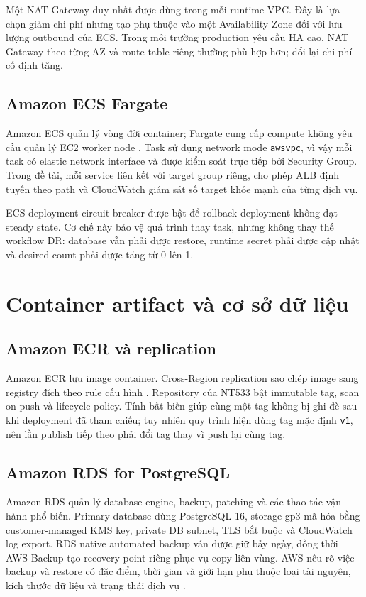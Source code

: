 Một NAT Gateway duy nhất được dùng trong mỗi runtime VPC. Đây là lựa chọn giảm chi phí nhưng tạo phụ thuộc vào một Availability Zone đối với lưu lượng outbound của ECS. Trong môi trường production yêu cầu HA cao, NAT Gateway theo từng AZ và route table riêng thường phù hợp hơn; đổi lại chi phí cố định tăng.

\subsection{Amazon ECS Fargate}

Amazon ECS quản lý vòng đời container; Fargate cung cấp compute không yêu cầu quản lý EC2 worker node \cite{aws-ecs-fargate}. Task sử dụng network mode \texttt{awsvpc}, vì vậy mỗi task có elastic network interface và được kiểm soát trực tiếp bởi Security Group. Trong đề tài, mỗi service liên kết với target group riêng, cho phép ALB định tuyến theo path và CloudWatch giám sát số target khỏe mạnh của từng dịch vụ.

ECS deployment circuit breaker được bật để rollback deployment không đạt steady state. Cơ chế này bảo vệ quá trình thay task, nhưng không thay thế workflow DR: database vẫn phải được restore, runtime secret phải được cập nhật và desired count phải được tăng từ 0 lên 1.

\section{Container artifact và cơ sở dữ liệu}

\subsection{Amazon ECR và replication}

Amazon ECR lưu image container. Cross-Region replication sao chép image sang registry đích theo rule cấu hình \cite{aws-ecr-replication}. Repository của NT533 bật immutable tag, scan on push và lifecycle policy. Tính bất biến giúp cùng một tag không bị ghi đè sau khi deployment đã tham chiếu; tuy nhiên quy trình hiện dùng tag mặc định \texttt{v1}, nên lần publish tiếp theo phải đổi tag thay vì push lại cùng tag.

\subsection{Amazon RDS for PostgreSQL}

Amazon RDS quản lý database engine, backup, patching và các thao tác vận hành phổ biến. Primary database dùng PostgreSQL 16, storage gp3 mã hóa bằng customer-managed KMS key, private DB subnet, TLS bắt buộc và CloudWatch log export. RDS native automated backup vẫn được giữ bảy ngày, đồng thời AWS Backup tạo recovery point riêng phục vụ copy liên vùng. AWS nêu rõ việc backup và restore có đặc điểm, thời gian và giới hạn phụ thuộc loại tài nguyên, kích thước dữ liệu và trạng thái dịch vụ \cite{aws-rds-backup-restore}.

